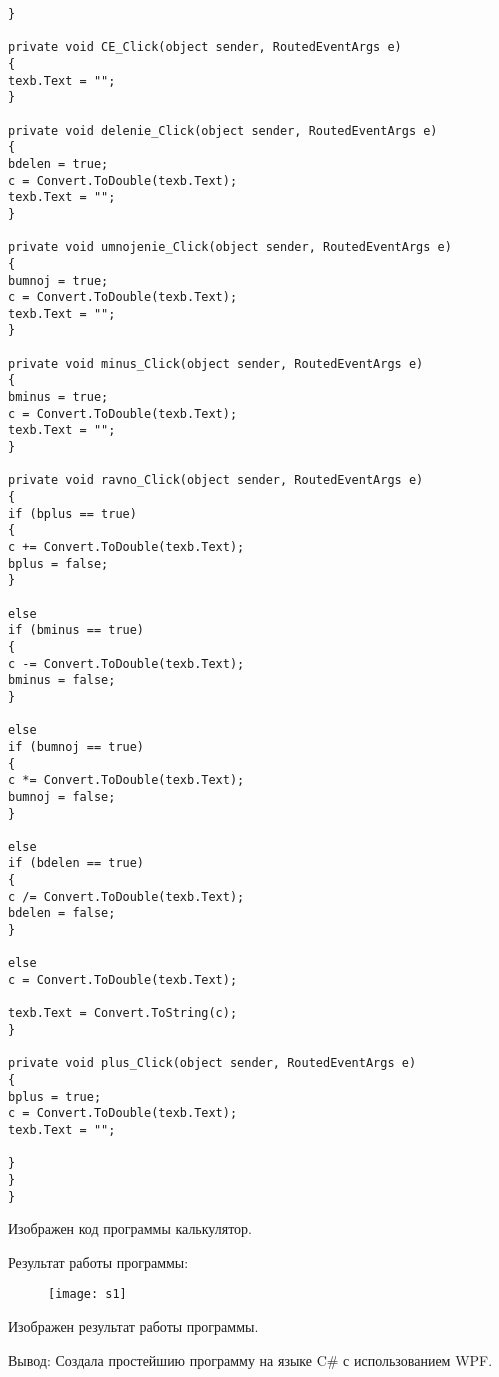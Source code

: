 \begin{verbatim}
}

private void CE_Click(object sender, RoutedEventArgs e)
{
texb.Text = "";
}

private void delenie_Click(object sender, RoutedEventArgs e)
{
bdelen = true;
c = Convert.ToDouble(texb.Text);
texb.Text = "";
}

private void umnojenie_Click(object sender, RoutedEventArgs e)
{
bumnoj = true;
c = Convert.ToDouble(texb.Text);
texb.Text = "";
}

private void minus_Click(object sender, RoutedEventArgs e)
{
bminus = true;
c = Convert.ToDouble(texb.Text);
texb.Text = "";
}

private void ravno_Click(object sender, RoutedEventArgs e)
{
if (bplus == true)
{
c += Convert.ToDouble(texb.Text);
bplus = false;
}

else
if (bminus == true)
{
c -= Convert.ToDouble(texb.Text);
bminus = false;
}

else
if (bumnoj == true)
{
c *= Convert.ToDouble(texb.Text);
bumnoj = false;
}

else
if (bdelen == true)
{
c /= Convert.ToDouble(texb.Text);
bdelen = false;
}

else
c = Convert.ToDouble(texb.Text);

texb.Text = Convert.ToString(c);              
}

private void plus_Click(object sender, RoutedEventArgs e)
{
bplus = true;
c = Convert.ToDouble(texb.Text);
texb.Text = "";

}
}
}
\end{verbatim}
Изображен код программы калькулятор.
\begin{center}
Результат работы программы:
\end{center}

\begin{figure}[h]
	\centering
	\texttt{[image: s1]}

	\label{fig:s1}
\end{figure}
Изображен результат работы программы.

Вывод: Создала простейшию программу на языке C\# с использованием WPF. 



